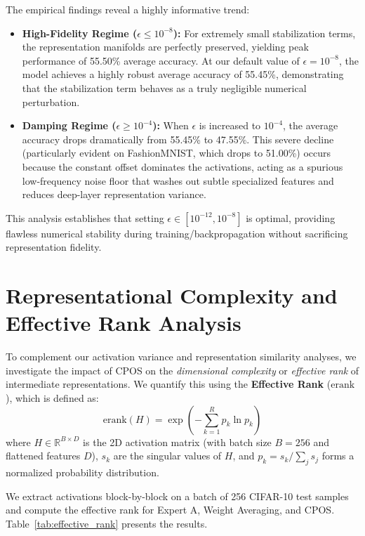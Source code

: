 \documentclass{article}
\theoremstyle{plain}
\theoremstyle{definition}
\theoremstyle{remark}
\begin{document}
The empirical findings reveal a highly informative trend:
\begin{itemize}
\item \textbf{High-Fidelity Regime ($\epsilon \le 10^{-8}$):} For extremely small stabilization terms, the representation manifolds are perfectly preserved, yielding peak performance of 55.50\% average accuracy. At our default value of $\epsilon = 10^{-8}$, the model achieves a highly robust average accuracy of 55.45\%, demonstrating that the stabilization term behaves as a truly negligible numerical perturbation.
\item \textbf{Damping Regime ($\epsilon \ge 10^{-4}$):} When $\epsilon$ is increased to $10^{-4}$, the average accuracy drops dramatically from 55.45\% to 47.55\%. This severe decline (particularly evident on FashionMNIST, which drops to 51.00\%) occurs because the constant offset dominates the activations, acting as a spurious low-frequency noise floor that washes out subtle specialized features and reduces deep-layer representation variance.
\end{itemize}
This analysis establishes that setting $\epsilon \in [10^{-12}, 10^{-8}]$ is optimal, providing flawless numerical stability during training/backpropagation without sacrificing representation fidelity.

\section{Representational Complexity and Effective Rank Analysis}
\label{subsec:effective_rank}
To complement our activation variance and representation similarity analyses, we investigate the impact of CPOS on the \emph{dimensional complexity} or \emph{effective rank} of intermediate representations. We quantify this using the \textbf{Effective Rank} ($\text{erank}$), which is defined as:
\begin{equation}
\text{erank}(H) = \exp\left( - \sum_{k=1}^R p_k \ln p_k \right)
\end{equation}
where $H \in \mathbb{R}^{B \times D}$ is the 2D activation matrix (with batch size $B=256$ and flattened features $D$), $s_k$ are the singular values of $H$, and $p_k = s_k / \sum_j s_j$ forms a normalized probability distribution.

We extract activations block-by-block on a batch of 256 CIFAR-10 test samples and compute the effective rank for Expert A, Weight Averaging, and CPOS. Table~\ref{tab:effective_rank} presents the results.
\end{document}
